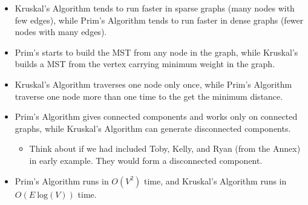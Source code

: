 \documentclass[12pt]{article}
\theoremstyle{definition}
\begin{document}
\begin{itemize}
	\item Kruskal's Algorithm tends to run faster in sparse graphs (many nodes with few edges), while Prim's Algorithm tends to run faster in dense graphs (fewer nodes with many edges).
	\item Prim's starts to build the MST from any node in the graph, while Kruskal's builds a MST from the vertex carrying minimum weight in the graph.
	\item Kruskal's Algorithm traverses one node only once, while Prim's Algorithm traverse one node more than one time to the get the minimum distance.
	\item Prim's Algorithm gives connected components and works only on connected graphs, while Kruskal's Algorithm can generate disconnected components.
	\begin{itemize}
		\item Think about if we had included Toby, Kelly, and Ryan (from the Annex) in early example. They would form a disconnected component.
	\end{itemize}	
	\item Prim's Algorithm runs in $O(V^2)$ time, and Kruskal's Algorithm runs in $O(E \ \textrm{log}(V))$ time.
\end{itemize}
\end{document}

